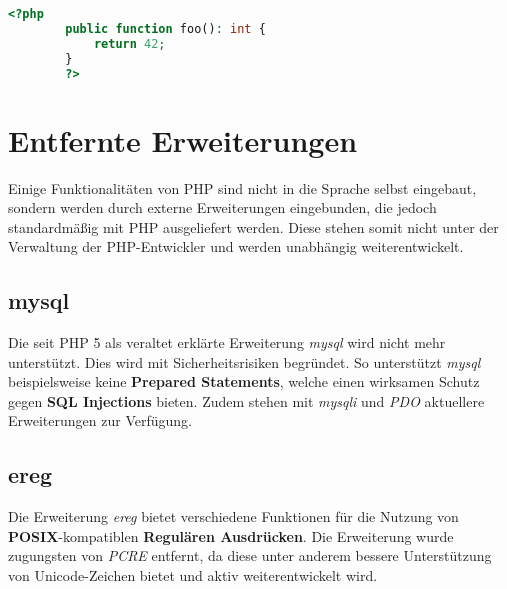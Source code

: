     \begin{lstlisting}[language=php, caption={Typdeklaration für Rückgabewerte}, label={lst:php7returnvalues}]
        <?php
        public function foo(): int {
            return 42;
        }
        ?>
    \end{lstlisting}

\section{Entfernte Erweiterungen}
Einige Funktionalitäten von \acs{PHP} sind nicht in die Sprache selbst eingebaut, sondern werden durch externe Erweiterungen eingebunden, die jedoch standardmäßig
mit \acs{PHP} ausgeliefert werden. Diese stehen somit nicht unter der Verwaltung der \acs{PHP}-Entwickler und werden unabhängig weiterentwickelt.
    \subsection{mysql}
    Die seit \acs{PHP} 5 als veraltet erklärte Erweiterung \textit{mysql} wird nicht mehr unterstützt. Dies wird mit Sicherheitsrisiken begründet. So unterstützt
    \textit{mysql} beispielsweise keine \textbf{Prepared Statements}, welche einen wirksamen Schutz gegen \textbf{SQL Injections} bieten. \cite{oracle_mysql_nodate}
    Zudem stehen mit \textit{mysqli} und \textit{PDO} aktuellere Erweiterungen zur Verfügung.
    
    \subsection{ereg}\label{ereg}
    Die Erweiterung \textit{ereg} bietet verschiedene Funktionen für die Nutzung von \textbf{POSIX}-kompatiblen \textbf{Regulären Ausdrücken}. Die Erweiterung wurde
    zugungsten von \textit{\acs{PCRE}} entfernt, da diese unter anderem bessere Unterstützung von Unicode-Zeichen bietet und aktiv weiterentwickelt wird. \cite{popov_php:_2014}

